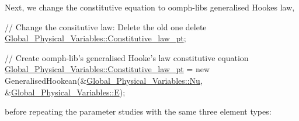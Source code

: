 Next, we change the constitutive equation to {\ttfamily oomph-\/lib\textquotesingle{}s} generalised Hooke\textquotesingle{}s law,


\begin{DoxyCodeInclude}
 
 
 \textcolor{comment}{// Change the consitutive law: Delete the old one}
 \textcolor{keyword}{delete} \hyperlink{namespaceGlobal__Physical__Variables_a2a37fb040c832ee7a086bb13bb02a100}{Global\_Physical\_Variables::Constitutive\_law\_pt};
 
 \textcolor{comment}{// Create oomph-lib's generalised Hooke's law constitutive equation}
 \hyperlink{namespaceGlobal__Physical__Variables_a2a37fb040c832ee7a086bb13bb02a100}{Global\_Physical\_Variables::Constitutive\_law\_pt} = 
  \textcolor{keyword}{new} GeneralisedHookean(&\hyperlink{namespaceGlobal__Physical__Variables_a3962c36313826b19f216f6bbbdd6a477}{Global\_Physical\_Variables::Nu},
                         &\hyperlink{namespaceGlobal__Physical__Variables_a09a019474b7405b35da2437f7779bc7e}{Global\_Physical\_Variables::E});

\end{DoxyCodeInclude}


before repeating the parameter studies with the same three element types\+:


